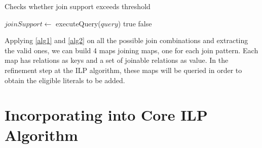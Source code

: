 \begin{algorithm}[!h]
  \caption{Checks whether join support exceeds threshold}
  \label{alg2}
     {
    }
    $joinSupport \leftarrow$ executeQuery($query$)\;
      {
      \Return true\;
    }{
      \Return false\;
    }
\end{algorithm}


Applying \ref{alg1} and \ref{alg2} on all the possible join combinations and extracting the valid ones, we can build 4
maps joining maps, one for each join pattern. Each map has relations as keys and a set of joinable relations as value.
In the refinement step at the ILP algorithm, these maps will be queried in order to obtain the eligible literals to be
added.

\subsection{}

\section{\graphname}
\label{ch:lattice}


\section{Incorporating \graphname into Core ILP Algorithm}
